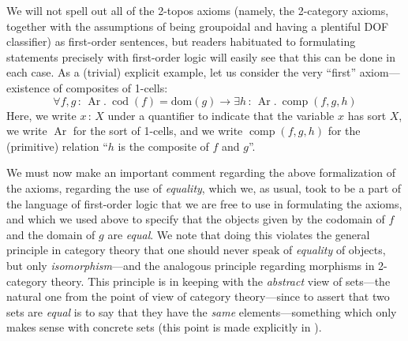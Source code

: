 \documentclass{amsart}
\newcommand\Ar{\operatorname{Ar}}
\newcommand\cod{\operatorname{cod}}
\newcommand\comp{\operatorname{comp}}
\newcommand\dom{\mathrm{dom}}
\newcommand\tolon{{\,:\,}}
\theoremstyle{definition}
\theoremstyle{remark}
\theoremstyle{plainwithref}
\begin{document}
We will not spell out all of the 2-topos axioms (namely, the 2-category axioms, together with the assumptions of being groupoidal and having a plentiful DOF classifier) as first-order sentences, but readers habituated to formulating statements precisely with first-order logic will easily see that this can be done in each case.
As a (trivial) explicit example, let us consider the very ``first'' axiom---existence of composites of 1-cells:
\[
  \forall f,g \tolon \Ar.\ \cod(f) = \dom(g) \to
  \exists h \tolon \Ar.\ \comp(f,g,h)
\]
Here, we write \( x \tolon X \) under a quantifier to indicate that the variable \( x \) has sort \( X \), we write \( \Ar \) for the sort of 1-cells, and we write \( \comp(f,g,h) \) for the (primitive) relation ``\( h \) is the composite of \( f \) and \( g \)''.

We must now make an important comment regarding the above formalization of the axioms, regarding the use of \emph{equality}, which we, as usual, took to be a part of the language of first-order logic that we are free to use in formulating the axioms, and which we used above to specify that the objects given by the codomain of \( f \) and the domain of \( g \) are \emph{equal}.
We note that doing this violates the general principle in category theory that one should never speak of \emph{equality} of objects, but only \emph{isomorphism}---and the analogous principle regarding morphisms in 2-category theory.
This principle is in keeping with the \emph{abstract} view of sets---the natural one from the point of view of category theory---since to assert that two sets are \emph{equal} is to say that they have the \emph{same} elements---something which only makes sense with concrete sets (this point is made explicitly in \cite{makkai-categorical-foundation,makkai-fom-both,makkai-abstract-sets}).
\end{document}
